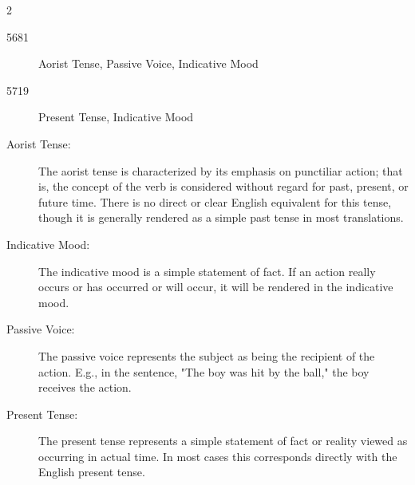 \documentclass[letterpaper]{article}
\begin{document}
\begin{multicols}{2}
\begin{description}
\item[5681]
Aorist Tense, Passive  Voice, Indicative  Mood
\item[5719]
Present Tense, Indicative  Mood
\item[Aorist Tense:]
The aorist tense is characterized by its emphasis on punctiliar action; that is, the concept of the verb is considered without regard for past, present, or future time.  There is no direct or clear English equivalent for this tense, though it is generally rendered as a simple past tense in most translations.

\item[Indicative  Mood:]
The indicative mood is a simple statement of fact.  If an action really occurs or has occurred or will occur, it will be rendered in the indicative mood.

\item[Passive  Voice:]
The passive voice represents the subject as being the recipient of the action.  E.g., in the sentence, "The boy was hit by the ball," the boy receives the action.

\item[Present Tense:]
The present tense represents a simple statement of fact or reality viewed as occurring in actual time.  In most cases this corresponds directly with the English present tense.

\end{description}
\end{multicols}
\end{document}
